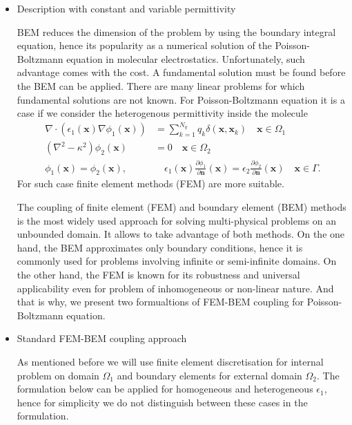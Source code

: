 \begin{itemize}
    \item Description with constant and variable permittivity 
    
BEM reduces the dimension of the problem by using the boundary integral equation, hence its popularity as a numerical solution of  the Poisson-Boltzmann equation in molecular electrostatics. Unfortunately, such advantage comes with the cost. A fundamental solution must be found before the BEM can be applied. There are many linear problems for which fundamental solutions are not known. For Poisson-Boltzmann equation it is a case if we consider the heterogenous permittivity inside the molecule
   \begin{align} \label{eq:pbe_vp}
\nabla \cdot \left(\epsilon_1(\mathbf{x}) \nabla \phi_1(\mathbf{x})\right) &= \sum_{k=1}^{N_q} q_k\delta(\mathbf{x},\mathbf{x}_k) \quad  \mathbf{x} \in \Omega_1\nonumber\\
\left(\nabla^2 - \kappa^2\right)\phi_2(\mathbf{x})  &= 0 \quad\mathbf{x}\in\Omega_2\nonumber\\
\phi_1(\mathbf{x})  = \phi_2(\mathbf{x}),  &\quad \epsilon_1(\mathbf{x})\frac{\partial\phi_1}{\partial\mathbf{n}}(\mathbf{x})  = \epsilon_2\frac{\partial\phi_2}{\partial\mathbf{n}}(\mathbf{x})  \quad \mathbf{x}\in \Gamma. 
\end{align}
For such case finite element methods (FEM) are more suitable.

The coupling of finite element (FEM) and boundary element (BEM) methods is the most widely used approach for solving multi-physical problems on an unbounded domain. It allows to take advantage of both methods. On the one hand, the BEM approximates only boundary conditions, hence it is commonly used for problems involving infinite or semi-infinite domains. On the other hand, the FEM is known for its robustness and universal applicability even for problem of inhomogeneous or non-linear nature.
And that is why, we present two formualtions of FEM-BEM coupling for Poisson-Boltzmann equation.
    
    \item Standard FEM-BEM coupling approach
   
   As mentioned before we will use finite element discretisation for internal problem on domain $\Omega_1$ and boundary elements for external domain $\Omega_2$. The formulation below can be applied for homogeneous and heterogeneous $\epsilon_1$, hence for simplicity we do not distinguish between these cases in the formulation.
    

\end{itemize}
